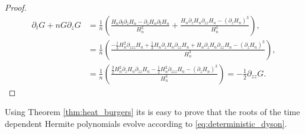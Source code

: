 \begin{proof}
    \begin{align*}
        \partial_t G + n G\partial_z G &= \frac1n\left(\frac{ H_n \partial_t \partial_z H_n - \partial_z H_n \partial_t H_n }{H_n^2} + \frac{H_n\partial_z H_n \partial_{zz}H_n - (\partial_z H_n)^3}{H_n^3} \right),\\ 
        &= \frac1n\left( \frac{ -\frac12H_n^2 \partial_{zzz} H_n + \frac12H_n\partial_z H_n \partial_{zz} H_n + H_n\partial_z H_n \partial_{zz}H_n - (\partial_z H_n)^3}{H_n^3} \right), \\ 
        &= \frac1n\left( \frac{\frac32 H_n^2 \partial_{z}H_n\partial_{zz}H_n - \frac12H_n^2\partial_{zzz}H_n - (\partial_z H_n)^3}{H_n^3} \right) = -\frac12 \partial_{zz}G.
    \end{align*}
\end{proof}

Using Theorem \ref{thm:heat_burgers} its is easy to prove that the roots of the time dependent Hermite polynomials evolve according to \eqref{eq:deterministic_dyson}.

